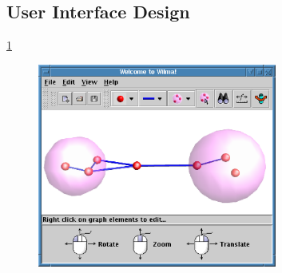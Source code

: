 \documentclass[runningheads]{cl2emult}
\begin{document}
\subsection{User Interface Design}
\ref{fig-controls}
\begin{figure}[h]
  \centering
    \label{fig-controls}
    \includegraphics[width=0.7\textwidth]{figures/wilmacontrols.eps}
\end{figure}
\end{document}
